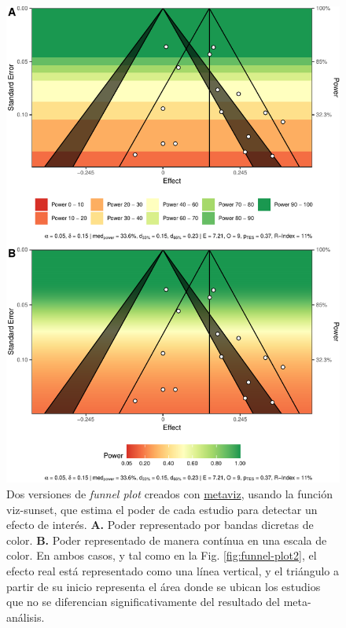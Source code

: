 \documentclass[
  bookmarksnumbered]{article}
\begin{document}
\begin{figure}
\centering
\includegraphics{Meta-analysis_files/figure-latex/funnel-plot3-1.pdf}
\caption{\label{fig:funnel-plot3}Dos versiones de \emph{funnel plot} creados con \href{https://cran.r-project.org/web/packages/metaviz/vignettes/metaviz.html}{metaviz}, usando la función viz-sunset, que estima el poder de cada estudio para detectar un efecto de interés. \textbf{A.} Poder representado por bandas dicretas de color. \textbf{B.} Poder representado de manera contínua en una escala de color. En ambos casos, y tal como en la Fig. \ref{fig:funnel-plot2}, el efecto real está representado como una línea vertical, y el triángulo a partir de su inicio representa el área donde se ubican los estudios que no se diferencian significativamente del resultado del meta-análisis.}
\end{figure}
\end{document}
